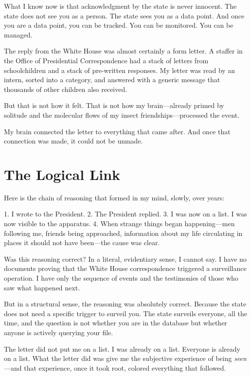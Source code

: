 \documentclass[11pt,openany]{book}
\begin{document}
What I know now is that acknowledgment by the state is never innocent. The state does not see you as a person. The state sees you as a data point. And once you are a data point, you can be tracked. You can be monitored. You can be managed.

The reply from the White House was almost certainly a form letter. A staffer in the Office of Presidential Correspondence had a stack of letters from schoolchildren and a stack of pre-written responses. My letter was read by an intern, sorted into a category, and answered with a generic message that thousands of other children also received.

But that is not how it felt. That is not how my brain---already primed by solitude and the molecular flows of my insect friendships---processed the event.

My brain connected the letter to everything that came after. And once that connection was made, it could not be unmade.

\section*{The Logical Link}

Here is the chain of reasoning that formed in my mind, slowly, over years:

1. I wrote to the President.
2. The President replied.
3. I was now on a list. I was now visible to the apparatus.
4. When strange things began happening---men following me, friends being approached, information about my life circulating in places it should not have been---the cause was clear.

Was this reasoning correct? In a literal, evidentiary sense, I cannot say. I have no documents proving that the White House correspondence triggered a surveillance operation. I have only the sequence of events and the testimonies of those who saw what happened next.

But in a structural sense, the reasoning was absolutely correct. Because the state does not need a specific trigger to surveil you. The state surveils everyone, all the time, and the question is not whether you are in the database but whether anyone is actively querying your file.

The letter did not put me on a list. I was already on a list. Everyone is already on a list. What the letter did was give me the subjective experience of being \textit{seen}---and that experience, once it took root, colored everything that followed.
\end{document}
